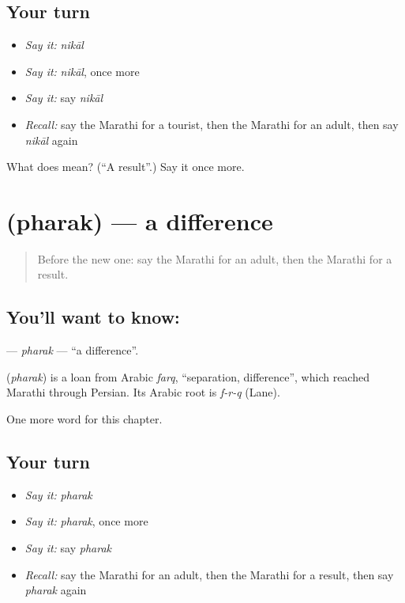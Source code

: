 \subsection*{Your turn}
\begin{itemize}
\raggedright
  \item \emph{Say it:} \emph{nikāl}
  \item \emph{Say it:} \emph{nikāl}, once more
  \item \emph{Say it:} say \emph{nikāl}
  \item \emph{Recall:} say the Marathi for a tourist, then the Marathi for an adult, then say \emph{nikāl} again
\end{itemize}

\begin{tcolorbox}[breakable,colback=teal!4,colframe=teal!35!black,title={Before you move on}]
What does  mean? (\textquotedblleft{}A result\textquotedblright{}.) Say it once more.
\end{tcolorbox}
\section[\texorpdfstring{\mr{फरक} (pharak)}{फरक (pharak)}]{ (pharak) — a difference}

\label{lesson:MR-C239-pharak}



\begin{quote}
Before the new one: say the Marathi for an adult, then the Marathi for a result.
\end{quote}

\subsection*{You'll want to know: }
\textbf{} — \emph{pharak} — \textquotedblleft{}a difference\textquotedblright{}.

\begin{cousinweb}
\textbf{} (\emph{pharak}) is a loan from Arabic \emph{farq}, \textquotedblleft{}separation, difference\textquotedblright{}, which reached Marathi through Persian. Its Arabic root is \emph{f-r-q} (Lane).
\end{cousinweb}

\begin{grammarlens}[title={What you've built}]
One more word for this chapter.
\end{grammarlens}

\subsection*{Your turn}
\begin{itemize}
\raggedright
  \item \emph{Say it:} \emph{pharak}
  \item \emph{Say it:} \emph{pharak}, once more
  \item \emph{Say it:} say \emph{pharak}
  \item \emph{Recall:} say the Marathi for an adult, then the Marathi for a result, then say \emph{pharak} again
\end{itemize}

